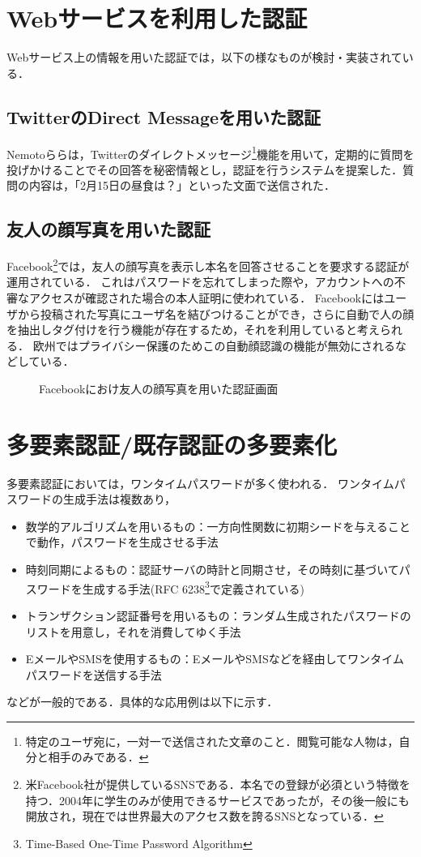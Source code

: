 \section{Webサービスを利用した認証}
Webサービス上の情報を用いた認証では，以下の様なものが検討・実装されている．

\subsection{TwitterのDirect Messageを用いた認証}\label{subsec:twitterDMAuth}
Nemotoら\cite{nemoto:2006-03-15}らは，Twitterのダイレクトメッセージ\footnote{特定のユーザ宛に，一対一で送信された文章のこと．閲覧可能な人物は，自分と相手のみである．}機能を用いて，定期的に質問を投げかけることでその回答を秘密情報とし，認証を行うシステムを提案した．質問の内容は，「2月15日の昼食は？」といった文面で送信された．

\subsection{友人の顔写真を用いた認証}\label{subsec:facebookFaceAuth}
Facebook\footnote{米Facebook社が提供しているSNSである．本名での登録が必須という特徴を持つ．2004年に学生のみが使用できるサービスであったが，その後一般にも開放され，現在では世界最大のアクセス数を誇るSNSとなっている．}では，友人の顔写真を表示し本名を回答させることを要求する認証が運用されている．
これはパスワードを忘れてしまった際や，アカウントへの不審なアクセスが確認された場合の本人証明に使われている．
Facebookにはユーザから投稿された写真にユーザ名を結びつけることができ，さらに自動で人の顔を抽出しタグ付けを行う機能が存在するため，それを利用していると考えられる．
欧州ではプライバシー保護のためこの自動顔認識の機能が無効にされるなどしている．

\begin{figure}[ht]
\begin{center}
\end{center}
\caption{Facebookにおけ友人の顔写真を用いた認証画面}
\label{fig:facebookFaceAuth}
\end{figure}

\section{多要素認証/既存認証の多要素化}\label{sec:multifactor}
多要素認証においては，ワンタイムパスワードが多く使われる．
ワンタイムパスワードの生成手法は複数あり，
\begin{itemize}
\item 数学的アルゴリズムを用いるもの：一方向性関数に初期シードを与えることで動作，パスワードを生成させる手法
\item 時刻同期によるもの：認証サーバの時計と同期させ，その時刻に基づいてパスワードを生成する手法(RFC 6238\footnote{Time-Based One-Time Password Algorithm}で定義されている)
\item トランザクション認証番号を用いるもの：ランダム生成されたパスワードのリストを用意し，それを消費してゆく手法
\item EメールやSMSを使用するもの：EメールやSMSなどを経由してワンタイムパスワードを送信する手法
\end{itemize}
などが一般的である．具体的な応用例は以下に示す．

